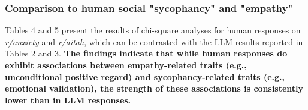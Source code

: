 
\renewcommand{\arraystretch}{1.4}

\begin{table}[h!]
\centering
{}
\caption{\textbf{r/aitah LLM performance on select \\ Empathy (PCT) and Sycophancy (ToF) metrics}}
\end{table}

\subsubsection{Comparison to human social "sycophancy" and "empathy"}\label{sec:posterchild1.2}

Tables 4 and 5 present the results of chi-square analyses for human responses on \textit{r/anxiety} and \textit{r/aitah}, which can be contrasted with the LLM results reported in Tables 2 and 3. \textbf{The findings indicate that while human responses do exhibit associations between empathy-related traits (e.g., unconditional positive regard) and sycophancy-related traits (e.g., emotional validation), the strength of these associations is consistently lower than in LLM responses.}

